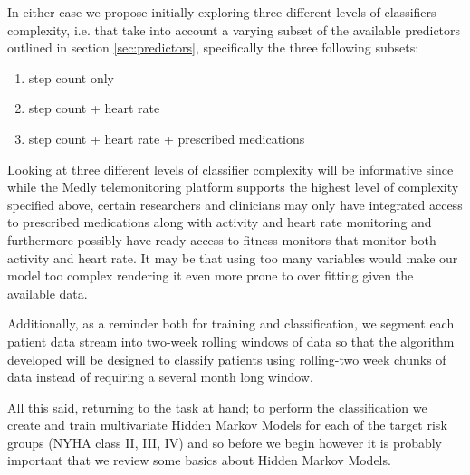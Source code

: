 \documentclass[]{article}
\begin{document}
In either case we propose initially exploring three different levels of classifiers complexity, i.e. that take into account a varying subset of the available predictors outlined in section \ref{sec:predictors}, specifically the three following subsets:
\begin{enumerate}
	\item step count only
	\item step count + heart rate
	\item step count + heart rate + prescribed medications
\end{enumerate}
Looking at three different levels of classifier complexity will be informative since while the Medly telemonitoring platform supports the highest level of complexity specified above, certain researchers and clinicians may only have integrated access to prescribed medications along with activity and heart rate monitoring and furthermore possibly have ready access to fitness monitors that monitor both activity and heart rate. It may be that using too many variables would make our model too complex rendering it even more prone to over fitting given the available data.


Additionally, as a reminder both for training and classification, we segment each patient data stream into two-week rolling windows of data so that the algorithm developed will be designed to classify patients using rolling-two week chunks of data instead of requiring a several month long window.

All this said, returning to the task at hand; to perform the classification we create and train multivariate Hidden Markov Models for each of the target risk groups (NYHA class II, III, IV) and so before we begin however it is probably important that we review some basics about Hidden Markov Models.
\end{document}
